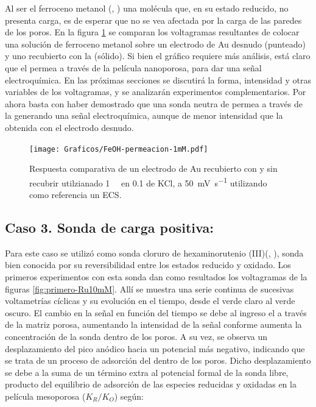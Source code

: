 		Al ser el ferroceno metanol (\ferroceno, \fc) una molécula que, en su estado reducido, no presenta carga, es de esperar que no se vea afectada por la carga de las paredes de los poros. En la figura \ref{fig:permeacion} se comparan los voltagramas resultantes de colocar una solución de ferroceno metanol sobre un electrodo de Au desnudo (punteado) y uno recubierto con la \pdm\space (sólido).  Si bien el gráfico  requiere más análisis, está claro que el \fc\space permea a través de la película nanoporosa, para dar una señal electroquímica. En las próximas secciones se discutirá la forma, intensidad y otras variables de los voltagramas, y se analizarán experimentos complementarios. Por ahora basta con haber demostrado que una sonda neutra de permea a través de la \pdm\space generando una señal electroquímica, aunque de menor intensidad que la obtenida con el electrodo desnudo.

		\begin{figure}[ht]
				\centering
		 	    \texttt{[image: Graficos/FeOH-permeacion-1mM.pdf]}
		        \caption[Permeación ferroceno metanol en \pdmF]{Respuesta comparativa de un electrodo de Au recubierto con \pdmF\space y sin recubrir utilzianado \fc\space \SI{1}{\milli\Molar} en \SI{0.1}{\Molar} de KCl, a \SI{50}{\milli\volt\per\second} utilizando como referencia un ECS.}
		        \label{fig:permeacion}
		      	\end{figure}

	\subsection{Caso 3. Sonda de carga positiva: \texorpdfstring{\aminorutenioCompleto}{aminorutenio}}

		Para este caso se utilizó como sonda cloruro de hexaminorutenio (III)\linebreak (\aminorutenioCompleto, \ru), sonda bien conocida por su reversibilidad entre los estados reducido y oxidado. Los primeros experimentos con esta sonda dan como resultados los voltagramas de la figuras \ref{fig:primero-Ru10mM}. Allí se muestra una serie continua de sucesivas voltametrías cíclicas y su evolución en el tiempo, desde el verde claro al verde oscuro. El cambio en la señal en función del tiempo se debe al ingreso el \ru\space a través de la matriz porosa, aumentando la intensidad de la señal conforme aumenta la concentración de la sonda dentro de los poros. A su vez, se observa un desplazamiento del pico anódico hacia un potencial más negativo, indicando que se trata de un proceso de adsorción del \ru\space dentro de los poros. Dicho desplazamiento se debe a la suma de un término extra al potencial formal de la sonda libre, producto del equilibrio de adsorción de las especies reducidas y oxidadas en la película mesoporosa ($K_R/K_O$) según\cite{Wi2000}: 

